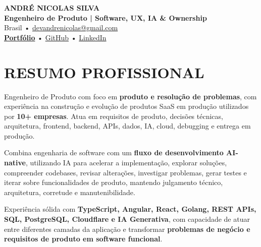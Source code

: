 \documentclass[10pt,a4paper]{article}
\begin{document}

\begin{center}

    {\LARGE \textbf{ANDRÉ NICOLAS SILVA}} \\[-2pt]

    {\normalsize \textbf{Engenheiro de Produto | Software, UX, IA \& Ownership}} \\[1pt]

    \footnotesize
    Brasil \quad • \quad
    \href{mailto:devandrenicolas@gmail.com}{devandrenicolas@gmail.com} \\[-1pt]

    \textbf{\href{https://portfolio-andrenicolas.vercel.app}{Portfólio}}
    \quad • \quad
    \href{https://github.com/devAndreNicolas}{GitHub}
    \quad • \quad
    \href{https://www.linkedin.com/in/devandrenicolas}{LinkedIn}

\end{center}

\vspace{-3pt}


\section*{RESUMO PROFISSIONAL}

\footnotesize

Engenheiro de Produto com foco em \textbf{produto e resolução de
problemas}, com experiência na construção e evolução de produtos SaaS
em produção utilizados por \textbf{10+ empresas}. Atua em requisitos
de produto, decisões técnicas, arquitetura, frontend, backend, APIs,
dados, IA, cloud, debugging e entrega em produção.

Combina engenharia de software com um \textbf{fluxo de desenvolvimento
AI-native}, utilizando IA para acelerar a implementação, explorar
soluções, compreender codebases, revisar alterações, investigar
problemas, gerar testes e iterar sobre funcionalidades de produto,
mantendo julgamento técnico, arquitetura, corretude e
manutenibilidade.

Experiência sólida com \textbf{TypeScript, Angular, React, Golang,
REST APIs, SQL, PostgreSQL, Cloudflare e IA Generativa}, com capacidade
de atuar entre diferentes camadas da aplicação e transformar
\textbf{problemas de negócio e requisitos de produto em software
funcional}.
\end{document}
